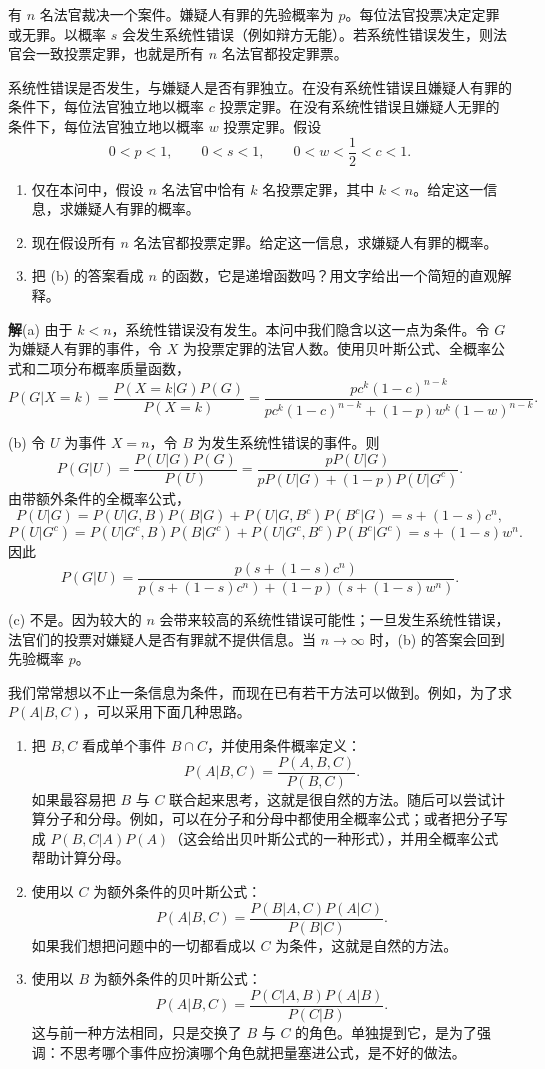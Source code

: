 \documentclass[UTF8, 12pt, fontset=fandol, oneside]{ctexart}
\begin{document}
有 $n$ 名法官裁决一个案件。嫌疑人有罪的先验概率为 $p$。每位法官投票决定定罪或无罪。以概率 $s$ 会发生系统性错误（例如辩方无能）。若系统性错误发生，则法官会一致投票定罪，也就是所有 $n$ 名法官都投定罪票。

系统性错误是否发生，与嫌疑人是否有罪独立。在没有系统性错误且嫌疑人有罪的条件下，每位法官独立地以概率 $c$ 投票定罪。在没有系统性错误且嫌疑人无罪的条件下，每位法官独立地以概率 $w$ 投票定罪。假设
\[
  0<p<1,\qquad 0<s<1,\qquad 0<w<\frac12<c<1.
\]

\begin{enumerate}
  \item[(a)] 仅在本问中，假设 $n$ 名法官中恰有 $k$ 名投票定罪，其中 $k<n$。给定这一信息，求嫌疑人有罪的概率。
  \item[(b)] 现在假设所有 $n$ 名法官都投票定罪。给定这一信息，求嫌疑人有罪的概率。
  \item[(c)] 把 (b) 的答案看成 $n$ 的函数，它是递增函数吗？用文字给出一个简短的直观解释。
\end{enumerate}

\noindent\textbf{解}\quad (a) 由于 $k<n$，系统性错误没有发生。本问中我们隐含以这一点为条件。令 $G$ 为嫌疑人有罪的事件，令 $X$ 为投票定罪的法官人数。使用贝叶斯公式、全概率公式和二项分布概率质量函数，
\[
  P(G|X=k)
  =
  \frac{P(X=k|G)P(G)}{P(X=k)}
  =
  \frac{pc^k(1-c)^{n-k}}
       {pc^k(1-c)^{n-k}+(1-p)w^k(1-w)^{n-k}}.
\]

(b) 令 $U$ 为事件 $X=n$，令 $B$ 为发生系统性错误的事件。则
\[
  P(G|U)
  =
  \frac{P(U|G)P(G)}{P(U)}
  =
  \frac{pP(U|G)}
       {pP(U|G)+(1-p)P(U|G^c)}.
\]
由带额外条件的全概率公式，
\[
  P(U|G)=P(U|G,B)P(B|G)+P(U|G,B^c)P(B^c|G)
  =
  s+(1-s)c^n,
\]
\[
  P(U|G^c)=P(U|G^c,B)P(B|G^c)+P(U|G^c,B^c)P(B^c|G^c)
  =
  s+(1-s)w^n.
\]
因此
\[
  P(G|U)
  =
  \frac{p(s+(1-s)c^n)}
       {p(s+(1-s)c^n)+(1-p)(s+(1-s)w^n)}.
\]

(c) 不是。因为较大的 $n$ 会带来较高的系统性错误可能性；一旦发生系统性错误，法官们的投票对嫌疑人是否有罪就不提供信息。当 $n\to\infty$ 时，(b) 的答案会回到先验概率 $p$。

我们常常想以不止一条信息为条件，而现在已有若干方法可以做到。例如，为了求 $P(A|B,C)$，可以采用下面几种思路。

\begin{enumerate}
  \item 把 $B,C$ 看成单个事件 $B\cap C$，并使用条件概率定义：
  \[
    P(A|B,C)=\frac{P(A,B,C)}{P(B,C)}.
  \]
  如果最容易把 $B$ 与 $C$ 联合起来思考，这就是很自然的方法。随后可以尝试计算分子和分母。例如，可以在分子和分母中都使用全概率公式；或者把分子写成 $P(B,C|A)P(A)$（这会给出贝叶斯公式的一种形式），并用全概率公式帮助计算分母。

  \item 使用以 $C$ 为额外条件的贝叶斯公式：
  \[
    P(A|B,C)=\frac{P(B|A,C)P(A|C)}{P(B|C)}.
  \]
  如果我们想把问题中的一切都看成以 $C$ 为条件，这就是自然的方法。

  \item 使用以 $B$ 为额外条件的贝叶斯公式：
  \[
    P(A|B,C)=\frac{P(C|A,B)P(A|B)}{P(C|B)}.
  \]
  这与前一种方法相同，只是交换了 $B$ 与 $C$ 的角色。单独提到它，是为了强调：不思考哪个事件应扮演哪个角色就把量塞进公式，是不好的做法。
\end{enumerate}
\end{document}
